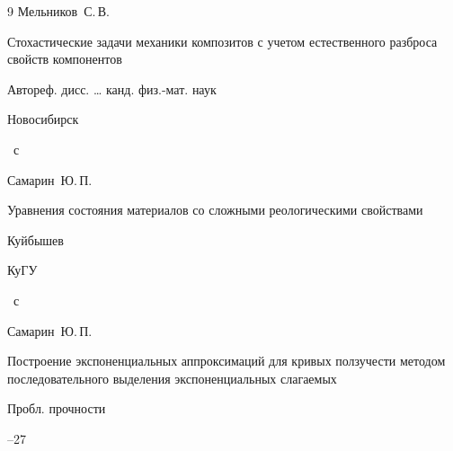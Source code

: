\begin{thebibliography}{9}
\by  Мельников~С.\,В.

\book Стохастические задачи механики композитов с учетом естественного разброса свойств компонентов

\bookinfo Автореф. дисс. {\ldots} канд. физ.-мат. наук

\publaddr Новосибирск


~с






\by  Самарин~Ю.\,П.

\book Уравнения состояния материалов со сложными реологическими свойствами

\publaddr Куйбышев

\publ КуГУ


~с






\by  Самарин~Ю.\,П.

\paper Построение экспоненциальных аппроксимаций для кривых ползучести методом последовательного выделения экспоненциальных слагаемых

\jour Пробл. прочности



--27





\end{thebibliography}





\newpage



\makeengtitlem

\lfoot[]{}

\rfoot[]{}




% 

